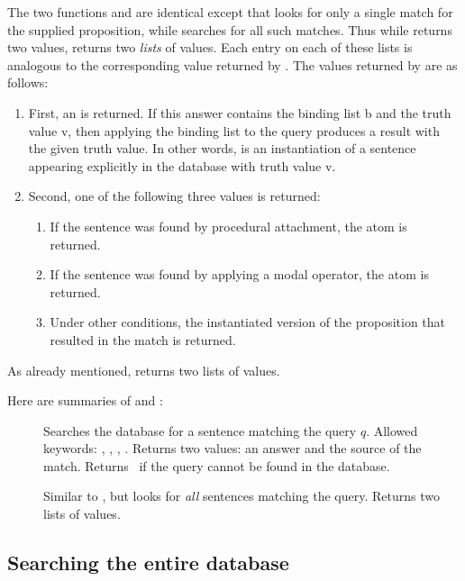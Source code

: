 The two functions  and  are identical
except that  looks for only a single match for the
supplied proposition, while  searches for all such
matches.  Thus while  returns two values, 
returns two {\em lists\/} of values.  Each entry on each of these
lists is analogous to the corresponding value returned by
.  The values returned by  are as
follows:
 \begin{enumerate}
 \item First, an  is returned.  If this answer contains
the binding list \type b and the truth value \type v, then applying
the binding list to the query produces a result with the given truth
value.  In other words,  is an instantiation of a
sentence appearing explicitly in the database with truth value \type
v.
 \item Second, one of the following three values is returned:
 \begin{enumerate}
 \item If the sentence was found by procedural attachment, the atom
 is returned.
 \item If the sentence was found by applying a modal operator, the
atom  is returned.
 \item Under other conditions, the instantiated version of the
proposition that resulted in the match is returned.
 \end{enumerate}
 \end{enumerate}

As already mentioned,  returns two lists of values.

Here are summaries of  and :

 \begin{description}
 \item [] Searches the database for a sentence
matching the query $q$.  Allowed keywords: , ,
\apa, \somo.  Returns two values: an answer and the source of the
match.  Returns \NIL\ if the query cannot be found in the database.
 \item [] Similar to , but looks
for {\em all\/} sentences matching the query.  Returns two lists of
values.
 \end{description}

\subsection{Searching the entire database}
\label{s.contents}

